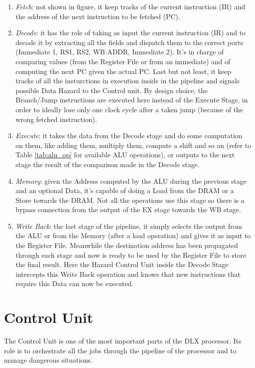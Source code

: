 \begin{enumerate}
    \item \emph{Fetch}: not shown in figure, it keep tracks of the current instruction (IR) and the address of the next instruction to be fetched (PC).
    \item \emph{Decode}: it has the role of taking as input the current instruction (IR) and to decode it by extracting all the fields and dispatch them to the correct ports (Immediate 1, RS1, RS2, WB ADDR, Immediate 2). It's in charge of comparing values (from the Register File or from an immediate) and of computing the next PC given the actual PC. Last but not least, it keep tracks of all the insturctions in execution inside in the pipeline and signals possible Data Hazard to the Control unit. By design choice, the Branch/Jump instructions are executed here instead of the Execute Stage, in order to ideally lose only one clock cycle after a taken jump (because of the wrong fetched instruction).
    \item \emph{Execute}: it takes the data from the Decode stage and do some computation on them, like adding them, multiply them, compute a shift and so on (refer to Table \ref{tab:alu_op} for available ALU operations), or outputs to the next stage the result of the comparison made in the Decode stage.
    \item \emph{Memory}: given the Address computed by the ALU during the previous stage and an optional Data, it's capable of doing a Load from the DRAM or a Store towards the DRAM. Not all the operations use this stage so there is a bypass connection from the output of the EX stage towards the WB stage.
    \item \emph{Write Back}: the last stage of the pipeline, it simply selects the output from the ALU or from the Memory (after a load operation) and gives it as input to the Register File. Meanwhile the destination address has been propagated through each stage and now is ready to be used by the Register File to store the final result. Here the Hazard Control Unit inside the Decode Stage intercepts this Write Back operation and knows that new instructions that require this Data can now be executed.
\end{enumerate}


\section{Control Unit}

The Control Unit is one of the most important parts of the DLX processor. Its role is to orchestrate all the jobs through the pipeline of the processor and to manage dangerous situations.\\

